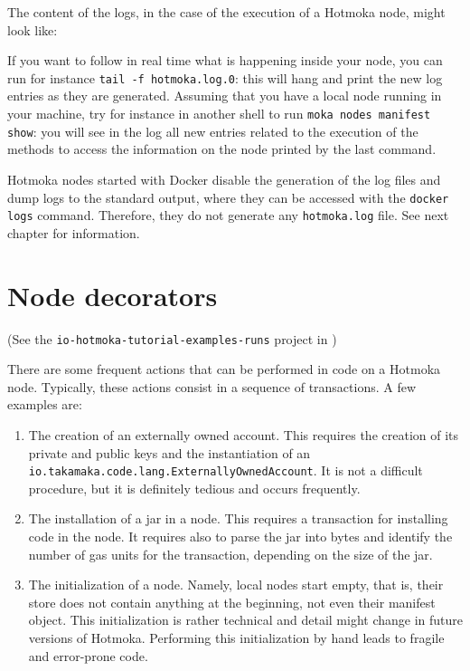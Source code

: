The content of the logs, in the case of the execution of a Hotmoka node, might look like:
%

If you want to follow in real time what is happening inside your node,
you can run for instance \texttt{tail -f hotmoka.log.0}: this
will hang and print the new log entries as they are generated.
Assuming that you have a local node running in your machine, try for instance in another shell
to run \texttt{moka nodes manifest show}: you will see in the log all new entries related
to the execution of the methods to access
the information on the node printed by the last command.
%
\begin{commentbox}
Hotmoka nodes started with Docker disable the generation of the log files and dump
logs to the standard output, where they can be accessed with the \texttt{docker logs} command.
Therefore, they do not generate any \texttt{hotmoka.log} file. See next chapter for information.
\end{commentbox}

\section{Node decorators}\label{sec:node_decorators}

\begin{center}
(See the \texttt{io-hotmoka-tutorial-examples-runs} project in \hotmokaRepo{})
\end{center}

There are some frequent actions that can be performed in code on a Hotmoka node.
Typically, these actions consist in a sequence of transactions. A few examples are:
%
\begin{enumerate}
\item The creation of an externally owned account. This requires the creation
	of its private and public keys and the instantiation of an
	\texttt{io.takamaka.code.lang.ExternallyOwnedAccount}. It is not a difficult
	procedure, but it is definitely tedious and occurs frequently.
\item The installation of a jar in a node. This requires a transaction for installing
	code in the node. It requires also to parse the jar into bytes and identify the
	number of gas units for the transaction, depending on the size of the jar.
\item The initialization of a node. Namely, local nodes start empty, that is,
	their store does not contain anything at the beginning, not even their manifest
	object. This initialization is rather technical and detail might change in future
	versions of Hotmoka. Performing this initialization by hand leads to fragile
	and error-prone code.
\end{enumerate}

